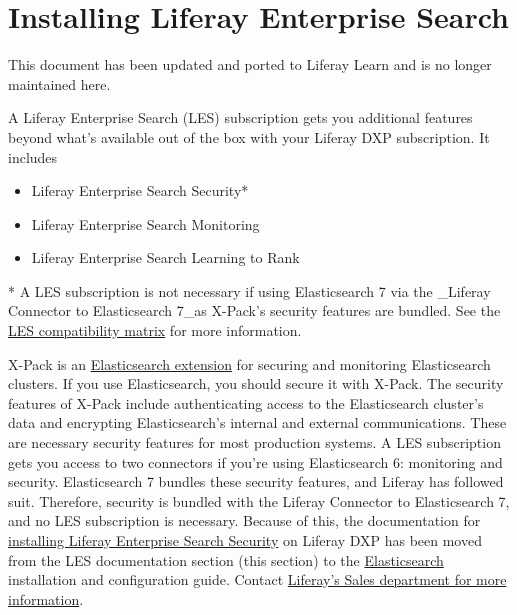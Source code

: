 \chapter{Installing Liferay Enterprise
Search}\label{installing-liferay-enterprise-search}

{This document has been updated and ported to Liferay Learn and is no
longer maintained here.}

A Liferay Enterprise Search (LES) subscription gets you additional
features beyond what's available out of the box with your Liferay DXP
subscription. It includes

\begin{itemize}
\tightlist
\item
  Liferay Enterprise Search Security*
\item
  Liferay Enterprise Search Monitoring
\item
  Liferay Enterprise Search Learning to Rank
\end{itemize}

* A LES subscription is not necessary if using Elasticsearch 7 via the
\_Liferay Connector to Elasticsearch 7\_as X-Pack's security features
are bundled. See the
\href{https://help.liferay.com/hc/en-us/articles/360016511651\#Liferay-Enterprise-Search}{LES
compatibility matrix} for more information.

X-Pack is an
\href{https://www.elastic.co/guide/en/elasticsearch/reference/7.x/setup-xpack.html}{Elasticsearch
extension} for securing and monitoring Elasticsearch clusters. If you
use Elasticsearch, you should secure it with X-Pack. The security
features of X-Pack include authenticating access to the Elasticsearch
cluster's data and encrypting Elasticsearch's internal and external
communications. These are necessary security features for most
production systems. A LES subscription gets you access to two connectors
if you're using Elasticsearch 6: monitoring and security. Elasticsearch
7 bundles these security features, and Liferay has followed suit.
Therefore, security is bundled with the Liferay Connector to
Elasticsearch 7, and no LES subscription is necessary. Because of this,
the documentation for
\href{/docs/7-2/deploy/-/knowledge_base/d/installing-liferay-enterprise-search-security}{installing
Liferay Enterprise Search Security} on Liferay DXP has been moved from
the LES documentation section (this section) to the
\href{/docs/7-2/deploy/-/knowledge_base/d/elasticsearch}{Elasticsearch}
installation and configuration guide. Contact
\href{https://www.liferay.com/contact-us\#contact-sales}{Liferay's Sales
department for more information}.

